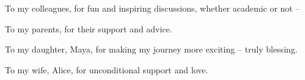 To my colleagues, for fun and inspiring discussions, whether academic or not -- 

To my parents, for their support and advice. 

To my daughter, Maya, for making my journey more exciting -- truly blessing. 

To my wife, Alice, for unconditional support and love.


%
%



